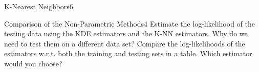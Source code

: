 \begin{questions}
\begin{question}{K-Nearest Neighbors}{6}
\begin{answer}
\end{answer}

\end{question}


\begin{question}{Comparison of the Non-Parametric Methods}{4}
Estimate the log-likelihood of the testing data using the KDE estimators and the K-NN estimators.
Why do we need to test them on a different data set? Compare the log-likelihoods of the estimators w.r.t. both the training and testing sets in a table. Which estimator would you choose?

\begin{answer}
\end{answer}

\end{question}

\end{questions}
